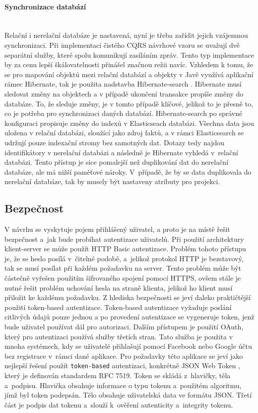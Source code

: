 \paragraph{Synchronizace databází}\mbox{}\\
Relační i nerelační databáze je nastavená, nyní je třeba zařídit jejich vzájemnou synchronizaci. Při implementaci čistého CQRS návrhové vzoru se uvažují dvě separátní služby, které spolu komunikují zasíláním zpráv. Tento typ implementace by za cenu lepší škálovatelnosti přinášel značnou režii navíc. Vzhledem k tomu, že se pro mapování objektů mezi relační databází a objekty v Javě využívá aplikační rámec Hibernate, tak je použita nadstavba Hibernate-search \cite{hibernateSearch}. Hibernate musí sledovat změny na objektech a v případě ukončení transakce propíše změny do databáze. To, že sleduje změny, je v tomto případě klíčové, jelikož to je přesně to, co je potřeba pro synchronizaci daných databází. Hibernate-search po správné konfiguraci propisuje změny do indexů v Elasticseach databázi. Všechna data jsou uložena v relační databázi, sloužící jako zdroj faktů, a v rámci Elasticsearch se udržují pouze indexační stromy bez samotných dat. Dotazy tedy najdou identifikátory v nerelační databázi a následně je Hibernate vyhledá v~relační databázi. Tento přístup je sice pomalejší než duplikování dat do nerelační databáze, ale má nižší paměťové nároky. V~případě, že by se data duplikovala do nerelační databáze, tak by musely být nastaveny atributy pro projekci.

\subsection{Bezpečnost}
V návrhu se vyskytuje pojem přihlášený uživatel, a proto je na místě řešit bezpečnost a~jak bude probíhat autentizace uživatelů. Při použití architektury klient-server se může použít HTTP Basic autentizace. Problém tohoto přístupu je, že se heslo posílá v~čitelné podobě, a~jelikož protokol HTTP je bezstavový, tak se musí posílat při každém požadavku na server. Tento problém může být částečně vyřešen použitím šifrovaného spojení pomocí HTTPS, ovšem stále je nutné řešit problém uchování hesla na straně klienta, jelikož ho klient musí přiložit ke každému požadavku. Z hlediska bezpečnosti se jeví daleko praktičtější použití token-based autentizace. Token-based autentizace vyžaduje poslání citlivých údajů pouze jednou a po provedení autentizace se vygeneruje token, jenž bude uživatel používat dál pro autorizaci. Dalším přístupem je použití OAuth, který pro autentizaci používá služby třetích stran. Tato služba je použita v mnoha systémech, kdy se uživatelé přihlašují pomocí Facebook nebo Google účtu bez registrace v~rámci dané aplikace. Pro požadavky této aplikace se jeví jako nejlepší řešení použít \texttt{token-based} autentizaci, konkrétně JSON Web Token \cite{jwt}, který je definován standardem RFC 7519. Token se skládá z~hlavičky, těla a~podpisu. Hlavička obsahuje informace o typu tokenu a~použitém algoritmu, jímž byl token podepsán. Tělo obsahuje uživatelská data ve formátu JSON. Třetí část je podpis dat tokenu a~slouží k~ověření autenticity a~integrity tokenu.

